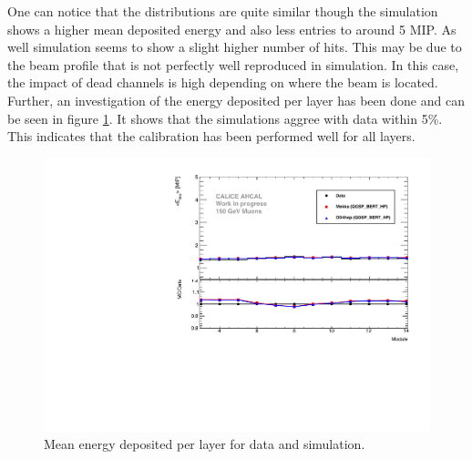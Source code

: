 One can notice that the distributions are quite similar though the simulation shows a higher mean deposited energy and also less entries to around 5 MIP. As well simulation seems to show a slight higher number of hits. This may be due to the beam profile that is not perfectly well reproduced in simulation. In this case, the impact of dead channels is high depending on where the beam is located. Further, an investigation of the energy deposited per layer has been done and can be seen in figure \ref{fig:muEdep}. It shows that the simulations aggree with data within 5\%. This indicates that the calibration has been performed well for all layers.

\begin{figure}[htbp!]
	\centering
	\includegraphics[width=0.7\linewidth]{chap5/fig_AHCAL_timing/Muons/ProfileMuons_Edep.pdf}
	\caption{Mean energy deposited per layer for data and simulation.}
	\label{fig:muEdep}
\end{figure}
